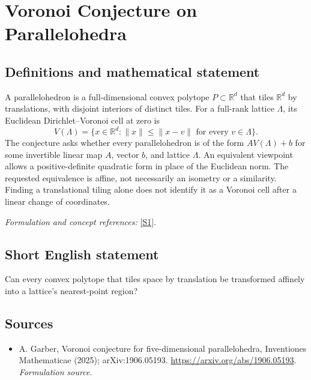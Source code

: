 \documentclass[11pt]{article}
\begin{document}
\section*{\texorpdfstring{Voronoi Conjecture on Parallelohedra}{Voronoi Conjecture on Parallelohedra}}\label{477}
\subsection{Definitions and mathematical statement}
A parallelohedron is a full-dimensional convex polytope $P\subset{\mathbb{R}}^d$ that tiles ${\mathbb{R}}^d$ by translations, with disjoint interiors of distinct tiles. For a full-rank lattice $\Lambda$, its Euclidean Dirichlet--Voronoi cell at zero is
\[
 V(\Lambda)=\{x\in{\mathbb{R}}^d:\|x\|\le\|x-v\|
                 \text{ for every }v\in\Lambda\}.
\]
The conjecture asks whether every parallelohedron is of the form $A V(\Lambda)+b$ for some invertible linear map $A$, vector $b$, and lattice $\Lambda$. An equivalent viewpoint allows a positive-definite quadratic form in place of the Euclidean norm. The requested equivalence is affine, not necessarily an isometry or a similarity. Finding a translational tiling alone does not identify it as a Voronoi cell after a linear change of coordinates.
\par\smallskip\textit{Formulation and concept references:} \href{https://arxiv.org/abs/1906.05193}{[S1]}.

\subsection{Short English statement}
Can every convex polytope that tiles space by translation be transformed affinely into a lattice's nearest-point region?
\subsection{Sources}
\begin{itemize}
\item[S1]A. Garber, Voronoi conjecture for five-dimensional parallelohedra, Inventiones Mathematicae (2025); arXiv:1906.05193.
\url{https://arxiv.org/abs/1906.05193}.
\textit{Formulation source.}
\end{itemize}
\end{document}
